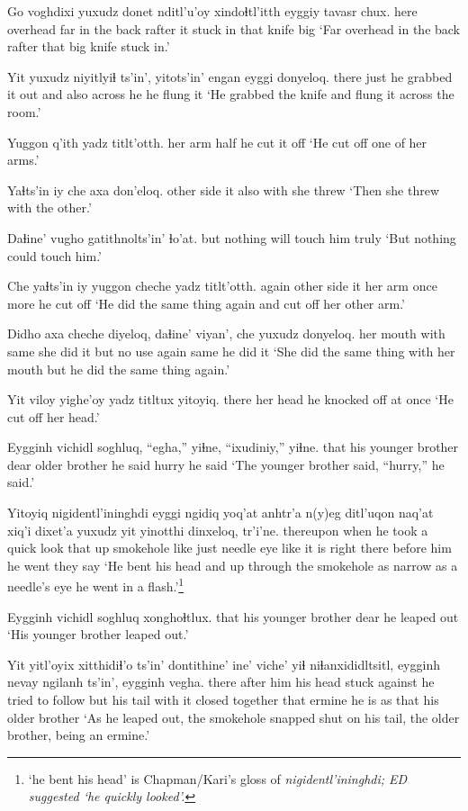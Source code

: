 \documentclass[12pt]{article}
\begin{document}
\gll Go voghdixi yuxudz donet nditl'u'oy xindoɬtl'itth eyggiy tavasr chux.
here overhead far {in the back} rafter {it stuck in} that knife big
\glt `Far overhead in the back rafter that big knife stuck in.'
\glend

\gll Yit yuxudz niyitlyiɬ  ts'in', yitots'in' engan  eyggi donyeloq. 
there just {he grabbed it out} and also  across  he {he flung it} 
\glt `He grabbed the knife and flung it across the room.'
\glend

\gll Yuggon q'ith {yadz titlt'otth.}
{her arm} half {he cut it off}
\glt `He cut off one of her arms.'
\glend

\gll Yaɬts'in iy che axa don'eloq.
{other side} it also with {she threw}
\glt `Then she threw with the other.'
\glend

\gll Daɬine' {vugho gatithnolts'in'} ɬo'at.
but {nothing will touch him} truly
\glt `But nothing could touch him.'
\glend

\gll Che yaɬts'in iy yuggon cheche {yadz titlt'otth.}
again {other side} it {her arm} {once more} {he cut off}
\glt `He did the same thing again and cut off her other arm.'
\glend

\gll Didho axa cheche diyeloq, daɬine' viyan', che yuxudz donyeloq.
{her mouth} with same {she did it} but  {no use} again same {he did it}
\glt `She did the same thing with her mouth but he did the same thing again.'
\glend

\gll Yit {viloy yighe'oy} {yadz titltux} yitoyiq.
there {her head} {he knocked off} {at once}
\glt `He cut off her head.'
\glend

\gll Eygginh vichidl  soghluq, ``egha,'' yiɬne, ``ixudiniy,'' yiɬne.
that  {his younger brother} dear {older brother} {he said} hurry  {he said}
\glt `The younger brother said, ``hurry,'' he said.'
\glend

\gll Yitoyiq nigidentl'ininghdi eyggi ngidiq yoq'at  anhtr'a n(y)eg ditl'uqon naq'at xiq'i dixet'a yuxudz yit yinotthi dinxeloq, tr'i'ne.
thereupon {when he took a quick look} that up smokehole like  just needle eye like {it is} right  there {before him} {he went} {they say}
\glt `He bent his head and up through the smokehole as narrow as a needle's eye he went in a flash.'\footnote{`he bent his head' is Chapman/Kari's gloss of \em nigidentl'ininghdi; \em ED suggested `he quickly looked'.} 
\glend

\gll Eygginh vichidl  soghluq xonghoɬtlux.
that {his younger brother} dear {he leaped out}
\glt `His younger brother leaped out.'
\glend

\gll Yit yitl'oyix xitthidiɬ'o   ts'in' dontithine'  ine' viche' yiɬ niɬanxididltsitl, eygginh nevay  ngilanh ts'in', eygginh vegha. 
there {after him} {his head stuck against} {} {he tried to follow} but {his tail} with {it closed together} that  ermine  {he is}  as  that  {his older brother}
\glt `As he leaped out, the smokehole snapped shut on his tail, the older brother, being an ermine.' 
\glend
\end{document}
